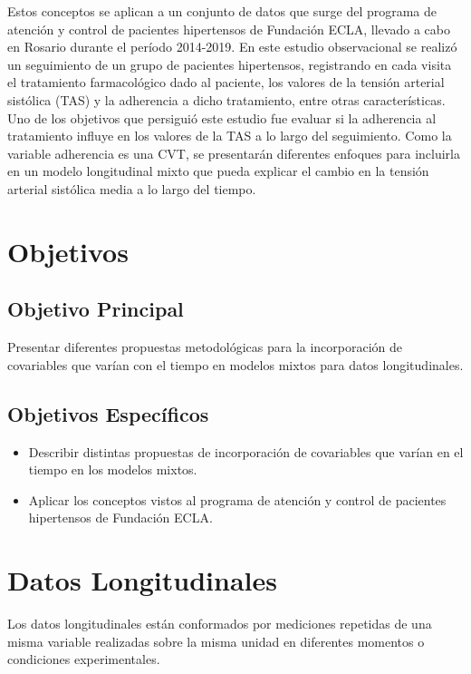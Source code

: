 \documentclass[spanish]{article}
\numberwithin{figure}{subsection}
\numberwithin{equation}{subsection}
\numberwithin{table}{subsection}
\begin{document}
Estos conceptos se aplican a un conjunto de datos que surge del programa de
atención y control de pacientes hipertensos de Fundación ECLA, llevado a cabo en
Rosario durante el período 2014-2019. En este estudio observacional se realizó
un seguimiento de un grupo de pacientes hipertensos, registrando en cada visita
el tratamiento farmacológico dado al paciente, los valores de la tensión
arterial sistólica (TAS) y la adherencia a dicho tratamiento, entre otras
características. Uno de los objetivos que persiguió este estudio fue evaluar si
la adherencia al tratamiento influye en los valores de la TAS a lo largo del
seguimiento. Como la variable adherencia es una CVT, se presentarán diferentes
enfoques para incluirla en un modelo longitudinal mixto que pueda explicar el
cambio en la tensión arterial sistólica media a lo largo del tiempo.

\newpage
\section{Objetivos}

\subsection{Objetivo Principal}

Presentar diferentes propuestas metodológicas para la incorporación de
covariables que varían con el tiempo en modelos mixtos para datos
longitudinales.

\subsection{Objetivos Específicos}

\begin{itemize}
	\item Describir distintas propuestas de incorporación de covariables que
	varían en el tiempo en los modelos mixtos.
	\item Aplicar los conceptos vistos al programa de
	atención y control de pacientes hipertensos de Fundación ECLA.
\end{itemize}

\newpage
\section{Datos Longitudinales}

Los datos longitudinales están conformados por mediciones repetidas de una misma
variable realizadas sobre la misma unidad en diferentes momentos o condiciones
experimentales.
\end{document}
